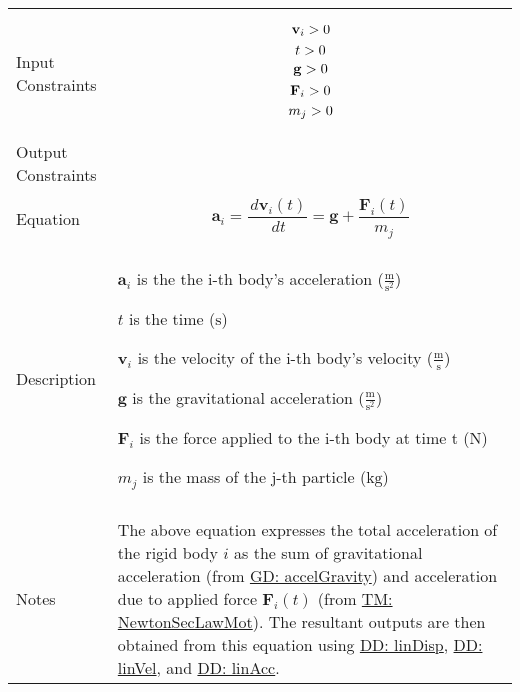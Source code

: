 \documentclass[12pt]{article}
\newcommand{\gt}{\ensuremath >}
\begin{document}
\begin{minipage}{\textwidth}
\begin{tabular}{>{\raggedright}p{}>{\raggedright\arraybackslash}p{}}
\\ \midrule \\
Input Constraints & \begin{displaymath}
                    {\mathbf{v}_{i}}\gt{}0
                    \end{displaymath}
                    \begin{displaymath}
                    t\gt{}0
                    \end{displaymath}
                    \begin{displaymath}
                    \mathbf{g}\gt{}0
                    \end{displaymath}
                    \begin{displaymath}
                    {\mathbf{F}_{i}}\gt{}0
                    \end{displaymath}
                    \begin{displaymath}
                    {m_{j}}\gt{}0
                    \end{displaymath}
\\ \midrule \\
Output Constraints & 
\\ \midrule \\
Equation & \begin{displaymath}
           {\mathbf{a}_{i}}=\frac{\,d{\mathbf{v}_{i}}\left(t\right)}{\,dt}=\mathbf{g}+\frac{{\mathbf{F}_{i}}\left(t\right)}{{m_{j}}}
           \end{displaymath}
\\ \midrule \\
Description & \begin{symbDescription}
              \item{${\mathbf{a}_{i}}$ is the the i-th body's acceleration ($\frac{\text{m}}{\text{s}^{2}}$)}
              \item{$t$ is the time (${\text{s}}$)}
              \item{${\mathbf{v}_{i}}$ is the velocity of the i-th body's velocity ($\frac{\text{m}}{\text{s}}$)}
              \item{$\mathbf{g}$ is the gravitational acceleration ($\frac{\text{m}}{\text{s}^{2}}$)}
              \item{${\mathbf{F}_{i}}$ is the force applied to the i-th body at time t (${\text{N}}$)}
              \item{${m_{j}}$ is the mass of the j-th particle (${\text{kg}}$)}
              \end{symbDescription}
\\ \midrule \\
Notes & The above equation expresses the total acceleration of the rigid body $i$ as the sum of gravitational acceleration (from \hyperref[GD:accelGravity]{GD: accelGravity}) and acceleration due to applied force ${\mathbf{F}_{i}}\left(t\right)$ (from \hyperref[TM:NewtonSecLawMot]{TM: NewtonSecLawMot}). The resultant outputs are then obtained from this equation using \hyperref[DD:linDisp]{DD: linDisp}, \hyperref[DD:linVel]{DD: linVel}, and \hyperref[DD:linAcc]{DD: linAcc}.
        

\end{tabular}
\end{minipage}
\end{document}
